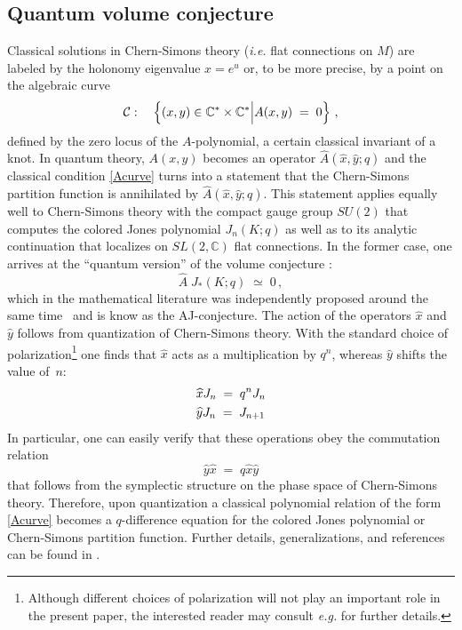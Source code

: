 \documentclass[hyper,letterpaper]{JHEP3}
\newcommand{\be}{\begin{equation}}
\newcommand{\ee}{\end{equation}}
\newcommand{\C}{{\mathbb C}}
\newcommand{\cC}{{\cal C }}
\renewcommand{\hat}{\widehat}
\begin{document}
\subsection{Quantum volume conjecture}

Classical solutions in Chern-Simons theory ({\it i.e.} flat connections on $M$) are labeled
by the holonomy eigenvalue $x = e^u$ or, to be more precise, by a point on the algebraic curve
\be
\cC: \quad \left\{(x,y)\in\mathbb{C}^*\times \mathbb{C}^*\Big|
A(x,y) \; = \; 0 \right\}\,,
\label{Acurve}
\ee
defined by the zero locus of the $A$-polynomial, a certain classical invariant of a knot.
In quantum theory, $A(x,y)$ becomes an operator $\hat A (\hat x, \hat y; q)$
and the classical condition \eqref{Acurve} turns into a statement that the Chern-Simons partition function
is annihilated by $\hat A (\hat x, \hat y; q)$. This statement applies equally well to Chern-Simons theory
with the compact gauge group $SU(2)$ that computes the colored Jones polynomial $J_n (K;q)$ as well as to
its analytic continuation that localizes on $SL(2,\C)$ flat connections.
In the former case, one arrives at the ``quantum version'' of the volume conjecture \cite{Apol}:
\be
\hat A \; J_* (K;q) \; \simeq \; 0 \,,
\label{VCquant}
\ee
which in the mathematical literature was independently proposed around the same time~\cite{Garoufalidis} and is know as the AJ-conjecture.
The action of the operators $\hat x$ and $\hat y$ follows from quantization of Chern-Simons theory.
With the standard choice of polarization\footnote{Although different choices of polarization will not play an important role
in the present paper, the interested reader may consult {\it e.g.} \cite{GMtorsion,Tudor} for further details.}
one finds that $\hat x$ acts as a multiplication by $q^n$, whereas $\hat y$ shifts the value of~$n$:
\begin{align}
& \hat x J_n \; = \; q^n J_n \label{xyactionJ} \\
& \hat y J_n \; = \; J_{n+1} \notag
\end{align}
In particular, one can easily verify that these operations obey the commutation relation
\be
\hat y \hat x \; = \; q \hat x \hat y
\label{xycomm}
\ee
that follows from the symplectic structure on the phase space of Chern-Simons theory.
Therefore, upon quantization a classical polynomial relation of the form \eqref{Acurve} becomes
a $q$-difference equation for the colored Jones polynomial or Chern-Simons partition function.
Further details, generalizations, and references can be found in \cite{DGreview}.\\
\end{document}
